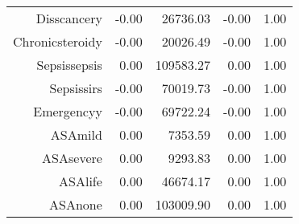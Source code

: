 \begin{tabular}{rrrrr}
$$  Diss\-cancer\-y & -0.00 & 26736.03 & -0.00 & 1.00 \\ 
  Chronic\-steroid\-y & -0.00 & 20026.49 & -0.00 & 1.00 \\ 
  Sepsis\-sepsis & 0.00 & 109583.27 & 0.00 & 1.00 \\ 
  Sepsis\-sirs & -0.00 & 70019.73 & -0.00 & 1.00 \\ 
  Emergency\-y & -0.00 & 69722.24 & -0.00 & 1.00 \\ 
  ASA\-mild & 0.00 & 7353.59 & 0.00 & 1.00 \\ 
  ASA\-severe & 0.00 & 9293.83 & 0.00 & 1.00 \\ 
  ASA\-life & 0.00 & 46674.17 & 0.00 & 1.00 \\ 
  ASA\-none & 0.00 & 103009.90 & 0.00 & 1.00 \\ 
   \hline
\end{tabular}

